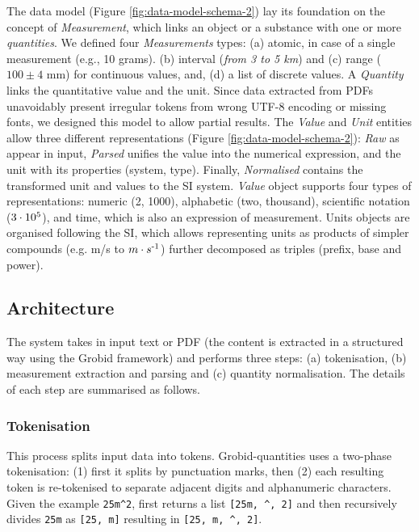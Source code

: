 \documentclass[sigconf]{acmart}
\begin{document}
The data model (Figure \ref{fig:data-model-schema-2}) lay its foundation on the concept of \textit{Measurement}, which links an object or a substance with one or more \textit{quantities}. We defined four \textit{Measurements} types: (a) atomic, in case of a single measurement (e.g., 10 grams). (b) interval (\textit{from 3 to 5 km}) and (c) range ($100 \pm 4$ mm) for continuous values, and, (d) a list of discrete values. A \textit{Quantity} links the quantitative value and the unit. 
Since data extracted from PDFs unavoidably present irregular tokens from wrong UTF-8 encoding or missing fonts, we designed this model to allow partial results. The \textit{Value} and \textit{Unit} entities allow three different representations (Figure \ref{fig:data-model-schema-2}): \textit{Raw} as appear in input, \textit{Parsed} unifies the value into the numerical expression, and the unit with its properties (system, type). Finally, \textit{Normalised} contains the transformed unit and values to the SI system. \textit{Value} object supports four types of representations: numeric (2, 1000), alphabetic (two, thousand), scientific notation ($3\cdot10\textsuperscript{5}$), and time, which is also an expression of measurement. Units objects are organised following the SI, which allows representing units as products of simpler compounds (e.g. m/s to $m \cdot s\textsuperscript{-1}$) further decomposed as triples (prefix, base and power).

\subsection{Architecture}
The system takes in input text or PDF (the content is extracted in a structured way using the Grobid framework) and performs three steps: (a) tokenisation, (b) measurement extraction and parsing and (c) quantity normalisation. The details of each step are summarised as follows. 

\subsubsection{Tokenisation}
This process splits input data into tokens. Grobid-quantities uses a two-phase tokenisation: (1) first it splits by punctuation marks, then (2) each resulting token is re-tokenised to separate adjacent digits and alphanumeric characters. Given the example \texttt{25m\^{}2}, first returns a list \texttt{[25m, \^{}, 2]} and then recursively divides \texttt{25m} as \texttt{[25, m]}  resulting in \texttt{[25, m, \^{}, 2]}.
\end{document}
